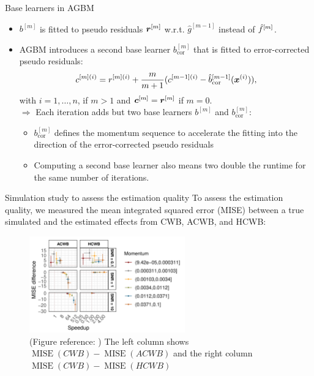 \documentclass[t,10pt]{beamer}
\begin{document}
\begin{frame}{Base learners in AGBM}
  \begin{itemize}
    \item
      \(b^{[m]}\) is fitted to pseudo residuals \(\bm{r}^{[m]}\) w.r.t.
      \(\hat{g}^{[m-1]}\) instead of \(\hat{f}^{[m]}\).

    \item
      AGBM introduces a second base learner $b^{[m]}_{\text{cor}}$ that is fitted to error-corrected pseudo residuals:
      \[c^{[m](i)} = r^{[m](i)} + \frac{m}{m+1}(c^{[m-1](i)} - \hat{b}_{\text{cor}}^{[m-1]}(\bm{x}^{(i)})),\]
      with \(i = 1, \dots, n\), if \(m > 1\) and \(\bm{c}^{[m]} = \bm{r}^{[m]}\) if
      \(m = 0\).\\[0.2cm]
      $\Rightarrow$ Each iteration adds but two base learners $b^{[m]}$ and $b^{[m]}_{\text{cor}}$:
      \begin{itemize}
        \item $b^{[m]}_{\text{cor}}$ defines the momentum sequence to accelerate the fitting into the direction of the error-corrected pseudo residuals
        \item Computing a second base learner also means two double the runtime for the same number of iterations.
      \end{itemize}
  \end{itemize}
\end{frame}

\begin{frame}{Simulation study to assess the estimation quality}
    To assess the estimation quality, we measured the mean integrated squared error (MISE) between a true simulated and the estimated effects from CWB, ACWB, and HCWB: 
    \begin{figure}
        \centering
        \includegraphics[width=0.6\textwidth]{figures/fig-acwb-estimation-quality.png}
        \caption{\small(Figure reference: \citet{schalk2022accelerated}) The left column shows $\operatorname{MISE}(CWB) - \operatorname{MISE}(ACWB)$ and the right column $\operatorname{MISE}(CWB) - \operatorname{MISE}(HCWB)$}
    \end{figure}
\end{frame}
\end{document}
